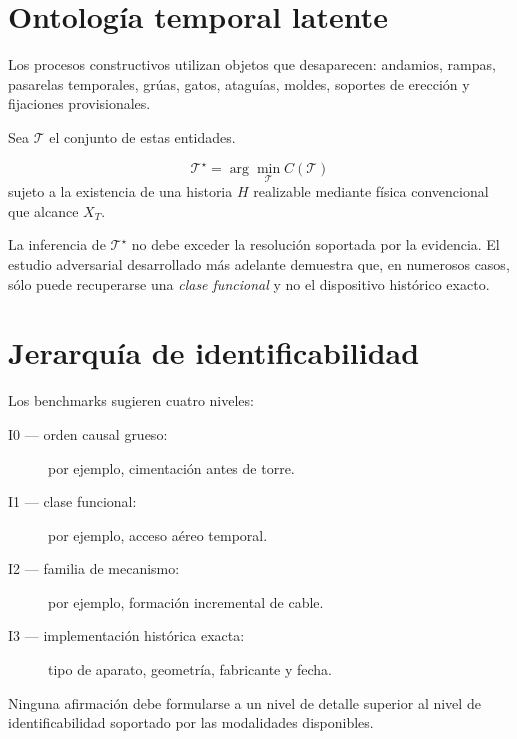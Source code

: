 
\section{Ontología temporal latente}

Los procesos constructivos utilizan objetos que desaparecen: andamios, rampas, pasarelas temporales, grúas, gatos, ataguías, moldes, soportes de erección y fijaciones provisionales.

Sea \(\mathcal T\) el conjunto de estas entidades.

\begin{definition}
\begin{equation}
\boxed{
\mathcal T^\star
=
\arg\min_{\mathcal T}
C(\mathcal T)
}
\end{equation}
sujeto a la existencia de una historia \(H\) realizable mediante física convencional que alcance \(X_T\).
\end{definition}

La inferencia de \(\mathcal T^\star\) no debe exceder la resolución soportada por la evidencia. El estudio adversarial desarrollado más adelante demuestra que, en numerosos casos, sólo puede recuperarse una \emph{clase funcional} y no el dispositivo histórico exacto.

\section{Jerarquía de identificabilidad}

Los benchmarks sugieren cuatro niveles:

\begin{description}
\item[I0 --- orden causal grueso:] por ejemplo, cimentación antes de torre.
\item[I1 --- clase funcional:] por ejemplo, acceso aéreo temporal.
\item[I2 --- familia de mecanismo:] por ejemplo, formación incremental de cable.
\item[I3 --- implementación histórica exacta:] tipo de aparato, geometría, fabricante y fecha.
\end{description}

\begin{principle}
Ninguna afirmación debe formularse a un nivel de detalle superior al nivel de identificabilidad soportado por las modalidades disponibles.
\end{principle}


